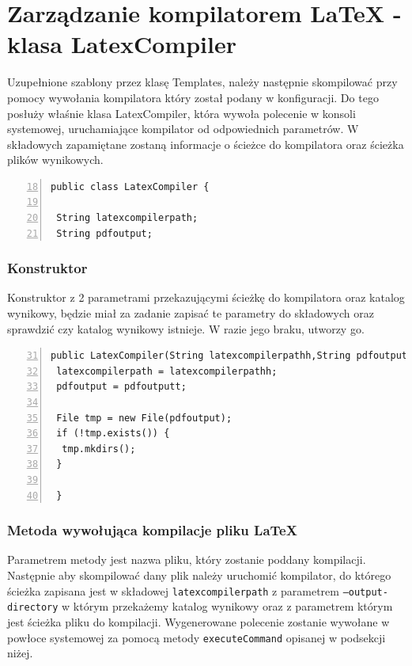 \section{Zarządzanie kompilatorem LaTeX - klasa LatexCompiler}

Uzupełnione szablony przez klasę Templates, należy następnie skompilować przy pomocy wywołania kompilatora który został podany w konfiguracji.
Do tego posłuży właśnie klasa LatexCompiler, która wywoła polecenie w konsoli systemowej, uruchamiające kompilator od odpowiednich parametrów.
W składowych zapamiętane zostaną informacje o ścieżce do kompilatora oraz ścieżka plików wynikowych.

 \begin{lstlisting}[numbers=left,firstnumber=18]
public class LatexCompiler {
    
 String latexcompilerpath;
 String pdfoutput;
\end{lstlisting}

\subsubsection*{Konstruktor}
Konstruktor z 2 parametrami przekazującymi ścieżkę do kompilatora oraz katalog wynikowy, będzie miał za zadanie zapisać te parametry do składowych oraz sprawdzić czy katalog wynikowy istnieje. W razie jego braku, utworzy go.

 \begin{lstlisting}[numbers=left,firstnumber=31]
public LatexCompiler(String latexcompilerpathh,String pdfoutputt){
 latexcompilerpath = latexcompilerpathh;
 pdfoutput = pdfoutputt;

 File tmp = new File(pdfoutput);
 if (!tmp.exists()) {
  tmp.mkdirs();
 }
    
 }
\end{lstlisting}

\subsubsection*{Metoda wywołująca kompilacje pliku LaTeX}

Parametrem metody jest nazwa pliku, który zostanie poddany kompilacji.  Następnie aby skompilować dany plik należy uruchomić kompilator, do którego ścieżka zapisana jest w składowej \texttt{latexcompilerpath} z parametrem \texttt{--output-directory} w którym przekażemy katalog wynikowy oraz z parametrem którym jest ścieżka pliku do kompilacji. Wygenerowane polecenie zostanie wywołane w powłoce systemowej za pomocą metody \texttt{executeCommand} opisanej w podsekcji niżej.

